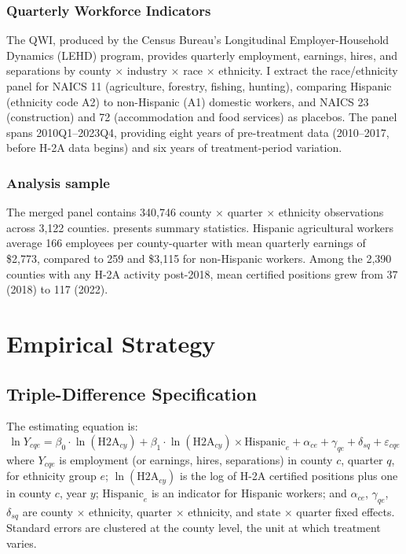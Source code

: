 \documentclass[12pt]{article}
\begin{document}
\subsubsection*{Quarterly Workforce Indicators} The QWI, produced by the Census Bureau's Longitudinal Employer-Household Dynamics (LEHD) program, provides quarterly employment, earnings, hires, and separations by county $\times$ industry $\times$ race $\times$ ethnicity. I extract the race/ethnicity panel for NAICS 11 (agriculture, forestry, fishing, hunting), comparing Hispanic (ethnicity code A2) to non-Hispanic (A1) domestic workers, and NAICS 23 (construction) and 72 (accommodation and food services) as placebos. The panel spans 2010Q1--2023Q4, providing eight years of pre-treatment data (2010--2017, before H-2A data begins) and six years of treatment-period variation.

\subsubsection*{Analysis sample} The merged panel contains 340,746 county $\times$ quarter $\times$ ethnicity observations across 3,122 counties.  presents summary statistics. Hispanic agricultural workers average 166 employees per county-quarter with mean quarterly earnings of \$2,773, compared to 259 and \$3,115 for non-Hispanic workers. Among the 2,390 counties with any H-2A activity post-2018, mean certified positions grew from 37 (2018) to 117 (2022).



\section{Empirical Strategy}

\subsection{Triple-Difference Specification}

The estimating equation is:
\begin{equation}
\ln Y_{cqe} = \beta_0 \cdot \ln(\text{H2A}_{cy}) + \beta_1 \cdot \ln(\text{H2A}_{cy}) \times \text{Hispanic}_e + \alpha_{ce} + \gamma_{qe} + \delta_{sq} + \varepsilon_{cqe}
\label{eq:ddd}
\end{equation}
where $Y_{cqe}$ is employment (or earnings, hires, separations) in county $c$, quarter $q$, for ethnicity group $e$; $\ln(\text{H2A}_{cy})$ is the log of H-2A certified positions plus one in county $c$, year $y$; $\text{Hispanic}_e$ is an indicator for Hispanic workers; and $\alpha_{ce}$, $\gamma_{qe}$, $\delta_{sq}$ are county $\times$ ethnicity, quarter $\times$ ethnicity, and state $\times$ quarter fixed effects. Standard errors are clustered at the county level, the unit at which treatment varies.
\end{document}
